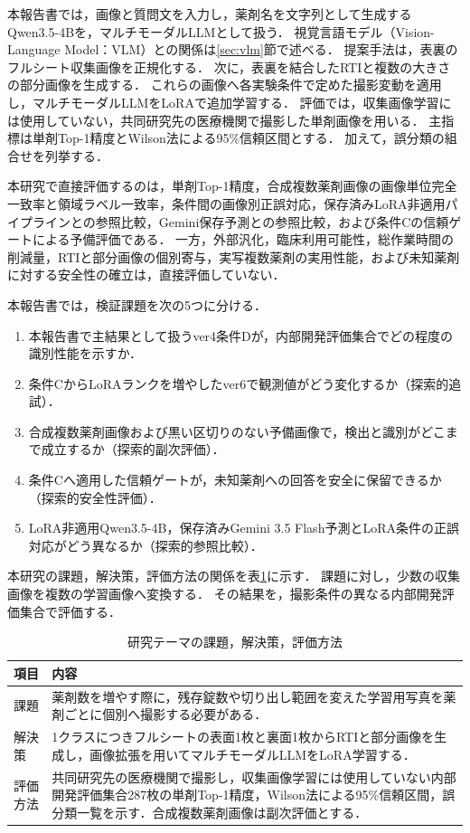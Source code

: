 \documentclass[uplatex,dvipdfmx]{jsarticle}
\begin{document}
本報告書では，画像と質問文を入力し，薬剤名を文字列として生成するQwen3.5-4Bを，マルチモーダルLLMとして扱う．
視覚言語モデル（Vision-Language Model：VLM）との関係は\ref{sec:vlm}節で述べる．
提案手法は，表裏のフルシート収集画像を正規化する．
次に，表裏を結合したRTIと複数の大きさの部分画像を生成する．
これらの画像へ各実験条件で定めた撮影変動を適用し，マルチモーダルLLMをLoRAで追加学習する．
評価では，収集画像学習には使用していない，共同研究先の医療機関で撮影した単剤画像を用いる．
主指標は単剤Top-1精度とWilson法による95\%信頼区間とする．
加えて，誤分類の組合せを列挙する．

本研究で直接評価するのは，単剤Top-1精度，合成複数薬剤画像の画像単位完全一致率と領域ラベル一致率，条件間の画像別正誤対応，保存済みLoRA非適用パイプラインとの参照比較，Gemini保存予測との参照比較，および条件Cの信頼ゲートによる予備評価である．
一方，外部汎化，臨床利用可能性，総作業時間の削減量，RTIと部分画像の個別寄与，実写複数薬剤の実用性能，および未知薬剤に対する安全性の確立は，直接評価していない．

本報告書では，検証課題を次の5つに分ける．
\begin{enumerate}
  \item 本報告書で主結果として扱うver4条件Dが，内部開発評価集合でどの程度の識別性能を示すか．
  \item 条件CからLoRAランクを増やしたver6で観測値がどう変化するか（探索的追試）．
  \item 合成複数薬剤画像および黒い区切りのない予備画像で，検出と識別がどこまで成立するか（探索的副次評価）．
  \item 条件Cへ適用した信頼ゲートが，未知薬剤への回答を安全に保留できるか（探索的安全性評価）．
  \item LoRA非適用Qwen3.5-4B，保存済みGemini 3.5 Flash予測とLoRA条件の正誤対応がどう異なるか（探索的参照比較）．
\end{enumerate}

本研究の課題，解決策，評価方法の関係を表\ref{tab:research_summary}に示す．
課題に対し，少数の収集画像を複数の学習画像へ変換する．
その結果を，撮影条件の異なる内部開発評価集合で評価する．

\begin{table}[H]
  \centering
  \caption{研究テーマの課題，解決策，評価方法}
  \label{tab:research_summary}
  \small
  \begin{tabular}{|p{2.0cm}|p{10.5cm}|}
    \hline
    項目 & 内容 \\ \hline
    課題 & 薬剤数を増やす際に，残存錠数や切り出し範囲を変えた学習用写真を薬剤ごとに個別へ撮影する必要がある． \\ \hline
    解決策 & 1クラスにつきフルシートの表面1枚と裏面1枚からRTIと部分画像を生成し，画像拡張を用いてマルチモーダルLLMをLoRA学習する． \\ \hline
    評価方法 & 共同研究先の医療機関で撮影し，収集画像学習には使用していない内部開発評価集合287枚の単剤Top-1精度，Wilson法による95\%信頼区間，誤分類一覧を示す．合成複数薬剤画像は副次評価とする． \\ \hline
  \end{tabular}
\end{table}
\end{document}

